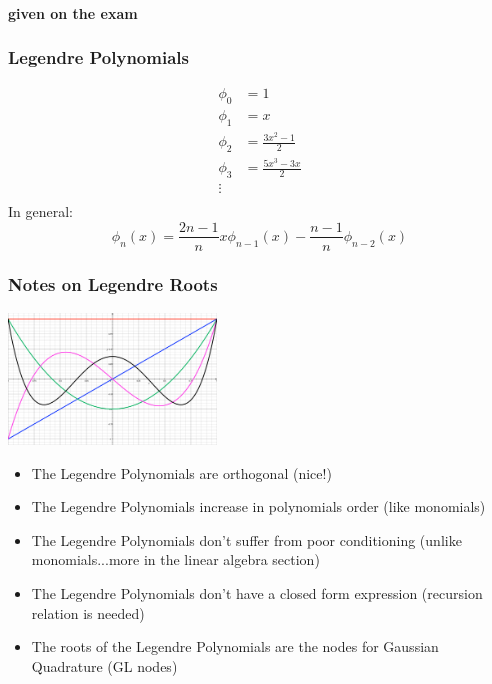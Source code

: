\documentclass[10pt]{beamer}
\begin{document}
\begin{frame}
\framesubtitle{given on the exam}
\frametitle{Legendre Polynomials}
  \begin{align*}
    \phi_0 & = 1\\
    \phi_1 & = x\\
    \phi_2 & = \frac{3x^2-1}{2}\\
    \phi_3 & = \frac{5x^3 - 3x}{2}\\
    \vdots & \\
  \end{align*}
In general:
  \begin{equation*}
    \phi_n(x) = \frac{2n-1}{n} x \phi_{n-1}(x) - \frac{n-1}{n}\phi_{n-2}(x)
  \end{equation*}
\end{frame}
\begin{frame}
\frametitle{Notes on Legendre Roots}
\vspace{-0.5cm}
\begin{center}
  \includegraphics[height=3.5cm]{./figs/legendre.pdf}
\end{center}
  \begin{itemize}
    \item The Legendre Polynomials are orthogonal (nice!)
    \item The Legendre Polynomials increase in polynomials order (like
    monomials)
    \item The Legendre Polynomials don't suffer from poor conditioning (unlike
    monomials...more in the linear algebra section)
    \item The Legendre Polynomials don't have a closed form expression
    (recursion relation is needed)
    \item The roots of the Legendre Polynomials are the nodes for Gaussian
    Quadrature (GL nodes)
  \end{itemize}
\end{frame}
\end{document}
